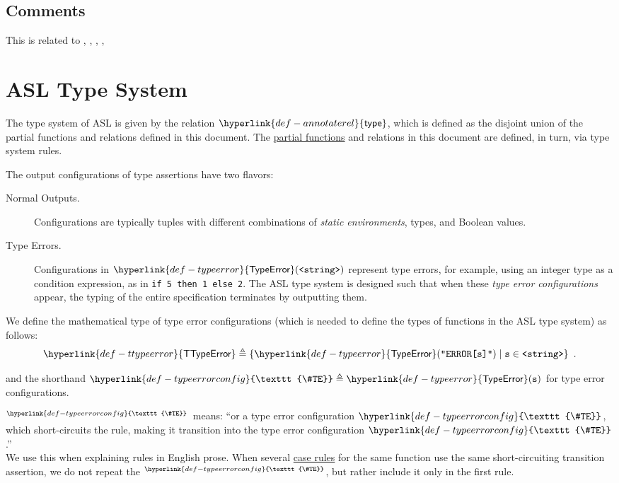 \documentclass{book}
\newcommand\TypeError[0]{\hyperlink{def-typeerror}{\textsf{TypeError}}}
\newcommand\TypeErrorVal[1]{\TypeError(\texttt{"ERROR[#1]"})}
\newcommand\TTypeError[0]{\hyperlink{def-ttypeerror}{\textsf{TTypeError}}}
\newcommand\TypeErrorConfig[0]{\hyperlink{def-typeerrorconfig}{\texttt{\#TE}}}
\newcommand\ProseOrTypeError[0]{\hyperlink{def-proseortypeerror}{$^{\TypeErrorConfig}$}}
\newcommand\annotaterel[0]{\hyperlink{def-annotaterel}{\textsf{type}}}
\newcommand\vs[0]{\texttt{s}}
\begin{document}
\subsection{Comments}
    This is related to , , , , 

\section{ASL Type System}
\hypertarget{def-annotaterel}{}
The type system of ASL is given by the relation $\annotaterel$, which is defined as the disjoint union
of the partial functions and relations defined in this document.
The \hyperlink{def-partialfunc}{partial functions} and relations in this document are defined, in turn, via type system rules.

The output configurations of type assertions have two flavors:
\begin{description}
  \item[Normal Outputs.] \hypertarget{def-normal-type-outputs}{}
  Configurations are typically tuples with different combinations
  of \emph{static environments}, types, and Boolean values.

  \hypertarget{def-typeerror}{}
  \item[Type Errors.] Configurations in $\TypeError(\texttt{<string>})$
  represent type errors, for example, using an integer type as a condition expression, as in \verb|if 5 then 1 else 2|.
  The ASL type system is designed such that when these \emph{type error configurations} appear,
  the typing of the entire specification terminates by outputting them.
\end{description}

We define the mathematical type of type error configurations
(which is needed to define the types of functions in the ASL type system)
as follows:
\hypertarget{def-ttypeerror}{}
\[
  \TTypeError \triangleq \{\TypeErrorVal{\vs} \;|\; \vs \in \texttt{<string>} \} \enspace.
\]

\hypertarget{def-typeerrorconfig}{}
and the shorthand $\TypeErrorConfig \triangleq \TypeError(\vs)$ for type error configurations.

\hypertarget{def-proseortypeerror}{}
\ProseOrTypeError\ means: ``or a type error configuration $\TypeErrorConfig$, which short-circuits the rule,
making it transition into the type error configuration $\TypeErrorConfig$.''\\
We use this when explaining rules in English prose.
%
When several \hyperlink{def-caserules}{case rules} for the same function use the same short-circuiting transition assertion,
we do not repeat the \ProseOrTypeError, but rather include it only in the first rule.
\end{document}
